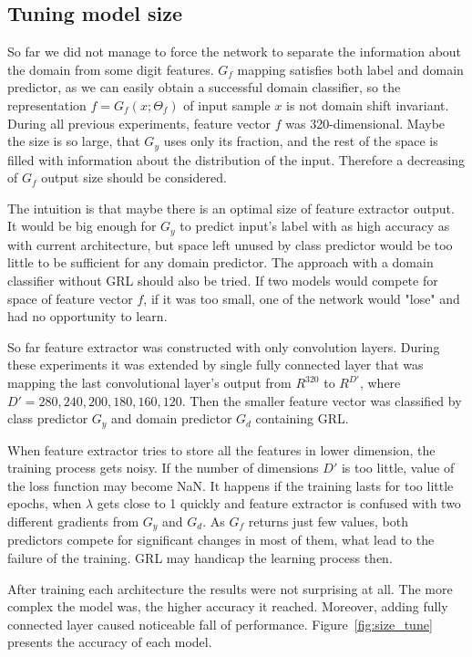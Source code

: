 \documentclass{article}
\begin{document}
\subsection{Tuning model size}
So far we did not manage to force the network to separate the information about the domain from some digit features. $G_{f}$ mapping satisfies both label and domain predictor, as we can easily obtain a successful domain classifier, so the representation $f=G_{f}(x;\Theta_{f})$ of input sample $x$ is not domain shift invariant. During all previous experiments, feature vector $f$ was 320-dimensional. Maybe the size is so large, that $G_{y}$ uses only its fraction, and the rest of the space is filled with information about the distribution of the input. Therefore a decreasing of $G_{f}$ output size should be considered.
\par
The intuition is that maybe there is an optimal size of feature extractor output. It would be big enough for $G_{y}$ to predict input's label with as high accuracy as with current architecture, but space left unused by class predictor would be too little to be sufficient for any domain predictor. The approach with a domain classifier without GRL should also be tried. If two models would compete for space of feature vector $f$, if it was too small, one of the network would "lose" and had no opportunity to learn.
\par
So far feature extractor was constructed with only convolution layers. During these experiments it was extended by single fully connected layer that was mapping the last convolutional layer's output from $R^{320}$ to $R^{D'}$, where $D' = 280, 240, 200, 180, 160, 120$. Then the smaller feature vector was classified by class predictor $G_{y}$ and domain predictor $G_{d}$ containing GRL. 
\par
When feature extractor tries to store all the features in lower dimension, the training process gets noisy. If the number of dimensions $D'$ is too little, value of the loss function may become NaN. It happens if the training lasts for too little epochs, when $\lambda$ gets close to 1 quickly and feature extractor is confused with two different gradients from $G_{y}$ and $G_{d}$. As $G_{f}$ returns just few values, both predictors compete for significant changes in most of them, what lead to the failure of the training. GRL may handicap the learning process then.
\par
After training each architecture the results were not surprising at all. The more complex the model was, the higher accuracy it reached. Moreover, adding fully connected layer caused noticeable fall of performance.  Figure~\ref{fig:size_tune} presents the accuracy of each model. 
\end{document}
